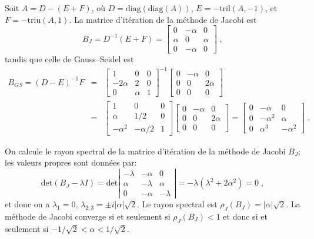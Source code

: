 \documentclass[11pt]{article}
\begin{document}
\begin{Answer}[ref={ex:3}]
\Question
Soit $A = D - (E+F)$, o\`u $D = \text{diag}(\text{diag}(A))$,
$E = - \text{tril}(A,-1)$, et $F = - \text{triu}(A,1)$.
La matrice d'it\'eration de la m\'ethode de Jacobi est
\[
  B_J = D^{-1} (E+F) =
  \left[
  \begin{array}{ccc}
   0     & -\alpha & 0 \\
   \alpha &      0 & \alpha \\
   0     & -\alpha & 0
  \end{array}
  \right] \; ,
\]
tandis que celle de Gauss--Seidel est
\begin{eqnarray*}
  B_{GS} = (D-E)^{-1} F &=&
  {\left[
   \begin{array}{ccc}
    1      &  0    & 0 \\
    -2\alpha &  2    & 0 \\
    0      & \alpha & 1
  \end{array}
  \right]}^{-1}
  \left[
  \begin{array}{ccc}
   0 &  -\alpha & 0 \\
   0 &       0 & 2\alpha \\
   0 &       0 & 0
  \end{array}
  \right] \\
  &=&
  \left[
   \begin{array}{ccc}
    1     &  0    & 0 \\
    \alpha &  1/2    & 0 \\
    -\alpha^2 & -\alpha/2 & 1
  \end{array}
  \right]
  \left[
  \begin{array}{ccc}
   0 &  -\alpha & 0 \\
   0 &       0 & 2\alpha \\
   0 &       0 & 0
  \end{array}
  \right] =
  \left[
  \begin{array}{ccc}
   0 & -\alpha   & 0 \\
   0 & -\alpha^2 & \alpha \\
   0 &  \alpha^3 & -\alpha^2
  \end{array}
  \right] \; .
\end{eqnarray*}

\Question
On calcule le rayon spectral de la matrice d'it\'eration de la m\'ethode de
Jacobi $B_J$; les valeurs propres sont donn\'ees par:
\[
  \textrm{det} (B_{J} - \lambda I)
  =\textrm{det} \left|
                   \begin{array}{ccc}
                   -\lambda & -\alpha   & 0 \\
                     \alpha & -\lambda  & \alpha \\
                         0 &  -\alpha & - \lambda
                   \end{array}
	      \right|
  = -\lambda ( \lambda^2 + 2\alpha^2) = 0\; ,
\]
et donc on a $\lambda_1 = 0$, $\lambda_{2,3} = \pm i |\alpha| \sqrt{2}$.
Le rayon spectral est $\rho_J (B_J) = |\alpha| \sqrt{2}$. La m\'ethode de Jacobi
converge si et seulement si $\rho_J (B_J) < 1$ et donc si et seulement si
$ - 1/ \sqrt{2} < \alpha < 1/ \sqrt{2} $.


\end{Answer}
\end{document}

